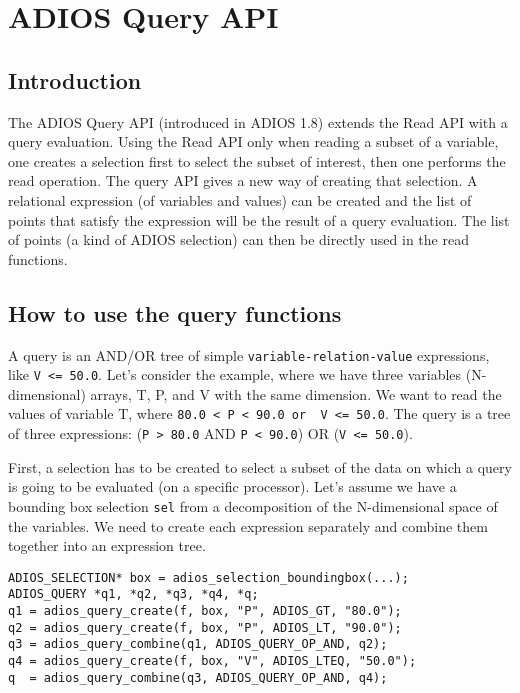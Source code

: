 \chapter{ADIOS Query API}
\label{chapter:query_api}

\section{Introduction}

The ADIOS Query API (introduced in ADIOS 1.8) extends the Read API with a query evaluation. Using the Read API only when reading a subset of a variable, one creates a selection first to select the subset of interest, then one performs the read operation. The query API gives a new way of creating that selection. A relational expression (of variables and values) can be created and the list of points that satisfy the expression will be the result of a query evaluation. The list of points (a kind of ADIOS selection) can then be directly used in the read functions. 


\section{How to use the query functions}
\label{sec:query-howto}
A query is an AND/OR tree of simple \verb+variable-relation-value+ expressions, like 
\verb+V <= 50.0+. Let's consider the example, where we have three variables (N-dimensional) arrays, T, P, and V with the same dimension. We want to read the values of variable T, where  \verb+80.0 < P < 90.0 or  V <= 50.0+. The query is a tree of three expressions: \linebreak
(\verb+P > 80.0+ AND \verb+P < 90.0+)  OR (\verb+V <= 50.0+).

First, a selection has to be created to select a subset of the data on which a query is going to be evaluated (on a specific processor). Let's assume we have a bounding box selection 
\verb+sel+ from a decomposition of the N-dimensional space of the variables. We need to create each expression separately and combine them together into an expression tree.

\begin{lstlisting}[alsolanguage=C]
ADIOS_SELECTION* box = adios_selection_boundingbox(...);
ADIOS_QUERY *q1, *q2, *q3, *q4, *q;
q1 = adios_query_create(f, box, "P", ADIOS_GT, "80.0");
q2 = adios_query_create(f, box, "P", ADIOS_LT, "90.0");
q3 = adios_query_combine(q1, ADIOS_QUERY_OP_AND, q2);
q4 = adios_query_create(f, box, "V", ADIOS_LTEQ, "50.0");
q  = adios_query_combine(q3, ADIOS_QUERY_OP_AND, q4);
\end{lstlisting}


